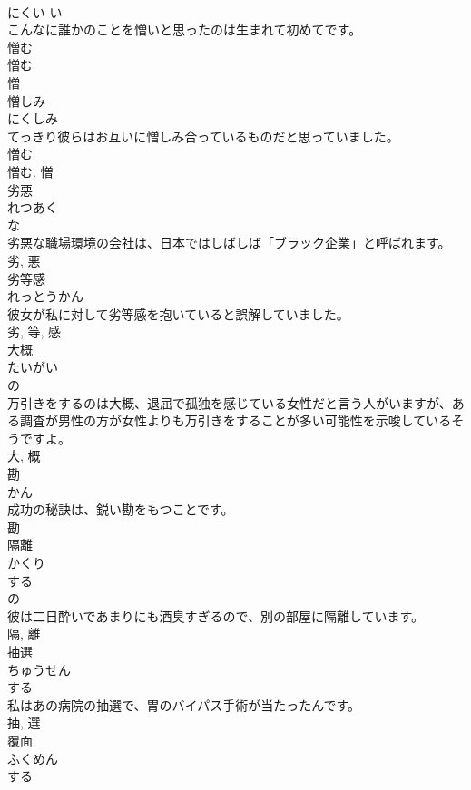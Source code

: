 \documentclass[8pt]{extreport}
\begin{document}
\begin{CJK}{UTF8}{min}
\\	にくい	い 
\\	こんなに誰かのことを憎いと思ったのは生まれて初めてです。	
\\	憎む 
\\	憎む 
\\	憎	
\\	憎しみ	
\\	にくしみ	
\\	てっきり彼らはお互いに憎しみ合っているものだと思っていました。	
\\	憎む 
\\	憎む.	憎	
\\	劣悪	
\\	れつあく	
\\	な 
\\	劣悪な職場環境の会社は、日本ではしばしば「ブラック企業」と呼ばれます。	
\\	劣, 悪	
\\	劣等感	
\\	れっとうかん	
\\	彼女が私に対して劣等感を抱いていると誤解していました。	
\\	劣, 等, 感	
\\	大概	
\\	たいがい	
\\	の 
\\	万引きをするのは大概、退屈で孤独を感じている女性だと言う人がいますが、ある調査が男性の方が女性よりも万引きをすることが多い可能性を示唆しているそうですよ。	
\\	大, 概	
\\	勘	
\\	かん	
\\	成功の秘訣は、鋭い勘をもつことです。	
\\	勘	
\\	隔離	
\\	かくり	
\\	する 
\\	の 
\\	彼は二日酔いであまりにも酒臭すぎるので、別の部屋に隔離しています。	
\\	隔, 離	
\\	抽選	
\\	ちゅうせん	
\\	する 
\\	私はあの病院の抽選で、胃のバイパス手術が当たったんです。	
\\	抽, 選	
\\	覆面	
\\	ふくめん	
\\	する 

\end{CJK}
\end{document}
